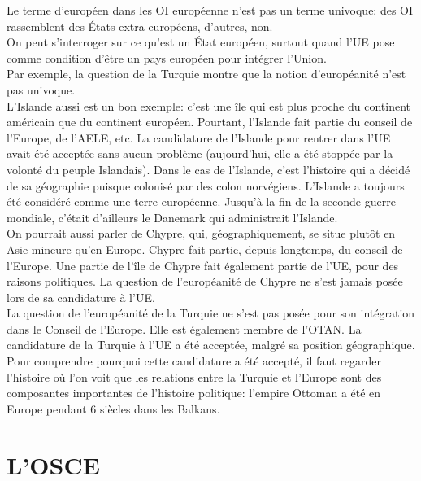 \documentclass[10pt, a4paper, openany]{book}
\begin{document}
Le terme d'européen dans les OI européenne n'est pas un terme univoque: des OI rassemblent des États extra-européens, d'autres, non. \\
On peut s'interroger sur ce qu'est un État européen, surtout quand l'UE pose comme condition d'être un pays européen pour intégrer l'Union. \\
Par exemple, la question de la Turquie montre que la notion d'européanité n'est pas univoque. \\
L'Islande aussi est un bon exemple: c'est une île qui est plus proche du continent américain que du continent européen. Pourtant, l'Islande fait partie du conseil de l'Europe, de l'AELE, etc. La candidature de l'Islande pour rentrer dans l'UE avait été acceptée sans aucun problème (aujourd'hui, elle a été stoppée par la volonté du peuple Islandais). Dans le cas de l'Islande, c'est l'histoire qui a décidé de sa géographie puisque colonisé par des colon norvégiens. L'Islande a toujours été considéré comme une terre européenne. Jusqu'à la fin de la seconde guerre mondiale, c'était d'ailleurs le Danemark qui administrait l'Islande. \\
On pourrait aussi parler de Chypre, qui, géographiquement, se situe plutôt en Asie mineure qu'en Europe. Chypre fait partie, depuis longtemps, du conseil de l'Europe. Une partie de l'île de Chypre fait également partie de l'UE, pour des raisons politiques. La question de l'européanité de Chypre ne s'est jamais posée lors de sa candidature à l'UE. \\
La question de l'européanité de la Turquie ne s'est pas posée pour son intégration dans le Conseil de l'Europe. Elle est également membre de l'OTAN. La candidature de la Turquie à l'UE a été acceptée, malgré sa position géographique. Pour comprendre pourquoi cette candidature a été accepté, il faut regarder l'histoire où l'on voit que les relations entre la Turquie et l'Europe sont des composantes importantes de l'histoire politique: l'empire Ottoman a été en Europe pendant 6 siècles dans les Balkans. 

\chapter{L'OSCE}
\end{document}
